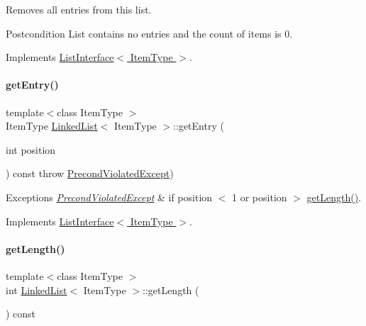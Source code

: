 Removes all entries from this list. \begin{DoxyPostcond}{Postcondition}
List contains no entries and the count of items is 0. 
\end{DoxyPostcond}


Implements \hyperlink{class_list_interface_adfda414908b645bdf19bcab8269168b7}{List\+Interface$<$ Item\+Type $>$}.

\hypertarget{class_linked_list_a341bfd7772c9d24d29eb7a7f3936915b}{}\label{class_linked_list_a341bfd7772c9d24d29eb7a7f3936915b} 
\paragraph{\texorpdfstring{get\+Entry()}{getEntry()}}
{\footnotesize\ttfamily template$<$class Item\+Type $>$ \\
Item\+Type \hyperlink{class_linked_list}{Linked\+List}$<$ Item\+Type $>$\+::get\+Entry (\begin{DoxyParamCaption}\item[{int}]{position }\end{DoxyParamCaption}) const throw  \hyperlink{class_precond_violated_except}{Precond\+Violated\+Except}) \hspace{0.3cm}{\ttfamily [virtual]}}


\begin{DoxyExceptions}{Exceptions}
{\em \hyperlink{class_precond_violated_except}{Precond\+Violated\+Except}} & if position $<$ 1 or position $>$ \hyperlink{class_linked_list_a61d045ef6008b494a1a516ecc992c0e7}{get\+Length()}. \\
\hline
\end{DoxyExceptions}


Implements \hyperlink{class_list_interface_a86987f69e5056d287212ede41db1956a}{List\+Interface$<$ Item\+Type $>$}.

\hypertarget{class_linked_list_a61d045ef6008b494a1a516ecc992c0e7}{}\label{class_linked_list_a61d045ef6008b494a1a516ecc992c0e7} 
\paragraph{\texorpdfstring{get\+Length()}{getLength()}}
{\footnotesize\ttfamily template$<$class Item\+Type $>$ \\
int \hyperlink{class_linked_list}{Linked\+List}$<$ Item\+Type $>$\+::get\+Length (\begin{DoxyParamCaption}{ }\end{DoxyParamCaption}) const\hspace{0.3cm}{\ttfamily [virtual]}}

